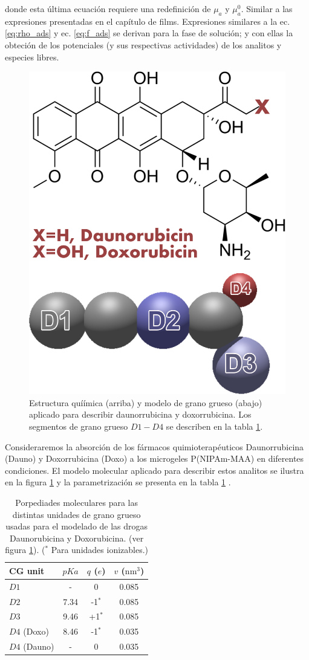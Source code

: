 \noindent donde esta \'ultima ecuaci\'on requiere una redefinici\'on de $\mu_a$ y $\mu_a^0$. Similar a las expresiones presentadas en el cap\'itulo de films.
Expresiones similares a la ec. \ref{eq:rho_ads} y ec. \ref{eq:f_ads} se derivan para la fase de soluci\'on; y con ellas la obteci\'on de los potenciales (y sus respectivas actividades) de los analitos y especies libres. 



\begin{figure}[!tb]
\centering
\includegraphics[width=0.35\linewidth]{Figures/graph-gel/dauno-doxo.png}
\caption{Estructura quí\'imica (arriba) y modelo de grano grueso (abajo) aplicado para describir daunorrubicina y doxorrubicina.
	Los segmentos de grano grueso $D1-D4$ se describen en la tabla \ref{table:drugs}.}
\label{fig:dauno-doxo}
\end{figure}


Consideraremos la absorci\'on de los f\'armacos quimioterap\'euticos Daunorrubicina (Dauno) y Doxorrubicina (Doxo) a los microgeles P(NIPAm-MAA) en diferentes condiciones.
El modelo molecular aplicado para describir estos analitos se ilustra en la figura \ref{fig:dauno-doxo} y la parametrizaci\'on se presenta en la tabla \ref{table:drugs} \cite{PerezChavez2020}.

\begin{table}
\centering
\begin{tabular}{|lccc|}
    \hline
    {CG unit} & {$pKa$} & {$q$ ($e$)} & {$v$ ($\text{nm}^3$)} \\
      \hline
$D1$ & - & 0 & 0.085\\
$D2$ & 7.34 & -1$^\ast$ & 0.085\\
$D3$ & 9.46 & +1$^\ast$ & 0.085\\ 
$D4$ (Doxo) & 8.46 & -1$^\ast$ & 0.035\\
$D4$ (Dauno) & - & 0 & 0.035 \\
    \hline
  \end{tabular}
 \caption{Porpediades moleculares para las distintas unidades de grano grueso usadas para el modelado de las drogas Daunorubicina y Doxorubicina. (ver figura \ref{fig:dauno-doxo}).
\footnotesize ($^\ast$ Para unidades ionizables.)}
\label{table:drugs} 
\end{table}




